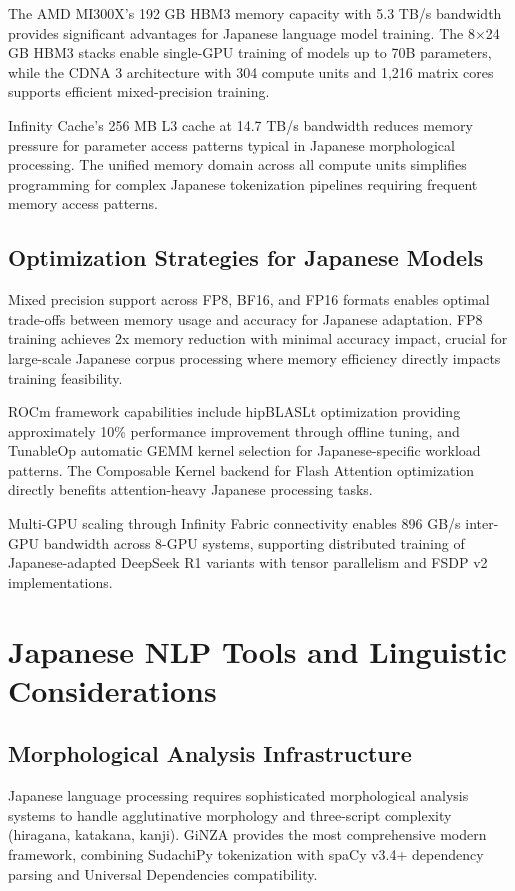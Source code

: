 \documentclass[11pt,a4paper]{article}
\begin{document}
The AMD MI300X's 192 GB HBM3 memory capacity with 5.3 TB/s bandwidth provides significant advantages for Japanese language model training. The 8×24 GB HBM3 stacks enable single-GPU training of models up to 70B parameters, while the CDNA 3 architecture with 304 compute units and 1,216 matrix cores supports efficient mixed-precision training.

Infinity Cache's 256 MB L3 cache at 14.7 TB/s bandwidth reduces memory pressure for parameter access patterns typical in Japanese morphological processing. The unified memory domain across all compute units simplifies programming for complex Japanese tokenization pipelines requiring frequent memory access patterns.

\subsection{Optimization Strategies for Japanese Models}

Mixed precision support across FP8, BF16, and FP16 formats enables optimal trade-offs between memory usage and accuracy for Japanese adaptation. FP8 training achieves 2x memory reduction with minimal accuracy impact, crucial for large-scale Japanese corpus processing where memory efficiency directly impacts training feasibility.

ROCm framework capabilities include hipBLASLt optimization providing approximately 10\% performance improvement through offline tuning, and TunableOp automatic GEMM kernel selection for Japanese-specific workload patterns. The Composable Kernel backend for Flash Attention optimization directly benefits attention-heavy Japanese processing tasks.

Multi-GPU scaling through Infinity Fabric connectivity enables 896 GB/s inter-GPU bandwidth across 8-GPU systems, supporting distributed training of Japanese-adapted DeepSeek R1 variants with tensor parallelism and FSDP v2 implementations.

\section{Japanese NLP Tools and Linguistic Considerations}

\subsection{Morphological Analysis Infrastructure}

Japanese language processing requires sophisticated morphological analysis systems to handle agglutinative morphology and three-script complexity (hiragana, katakana, kanji). GiNZA provides the most comprehensive modern framework, combining SudachiPy tokenization with spaCy v3.4+ dependency parsing and Universal Dependencies compatibility.
\end{document}
